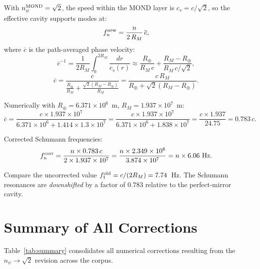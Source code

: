 \documentclass[aps,prd,twocolumn,superscriptaddress]{revtex4-2}
\newcommand{\npsi}{n_\psi}
\newcommand{\ee}[1]{\times 10^{#1}}
\begin{document}
With $\npsi^{\rm MOND} = \sqrt{2}$, the speed within the MOND layer is
$c_s = c/\sqrt{2}$, so the effective cavity supports modes at:
\begin{equation}
f_n^{\rm new} = \frac{n}{2\,R_M}\,\overline{c},
\end{equation}
where $\overline{c}$ is the path-averaged phase velocity:
\begin{equation}
\overline{c}^{-1} = \frac{1}{2R_M}\int_0^{2R_M}\frac{dr}{c_s(r)}
\approx \frac{R_\oplus}{R_M\,c} + \frac{R_M - R_\oplus}{R_M\,c/\sqrt{2}},
\end{equation}
\begin{equation}
\overline{c} = \frac{c}{\frac{R_\oplus}{R_M} + \frac{\sqrt{2}(R_M-R_\oplus)}{R_M}}
= \frac{c\,R_M}{R_\oplus + \sqrt{2}(R_M - R_\oplus)}.
\end{equation}

Numerically with $R_\oplus = 6.371\ee6$~m, $R_M = 1.937\ee7$~m:
\begin{equation}
\overline{c} = \frac{c \times 1.937\ee7}{6.371\ee6 + 1.414\times 1.3\ee7}
= \frac{c \times 1.937\ee7}{6.371\ee6 + 1.838\ee7}
= \frac{c \times 1.937}{24.75} = 0.783\,c.
\end{equation}

Corrected Schumann frequencies:
\begin{equation}
f_n^{\rm corr} = \frac{n \times 0.783\,c}{2\times1.937\ee7}
= \frac{n \times 2.349\ee8}{3.874\ee7} = n \times 6.06~\text{Hz}.
\label{eq:Schumann-corrected}
\end{equation}

Compare the uncorrected value $f_1^{\rm old} = c/(2R_M) = 7.74$~Hz.
The Schumann resonances are \emph{downshifted} by a factor of $0.783$
relative to the perfect-mirror cavity.

\section{Summary of All Corrections}
\label{sec:summary}

Table~\ref{tab:summary} consolidates all numerical corrections
resulting from the $\npsi \to \sqrt{2}$ revision across the corpus.
\end{document}
